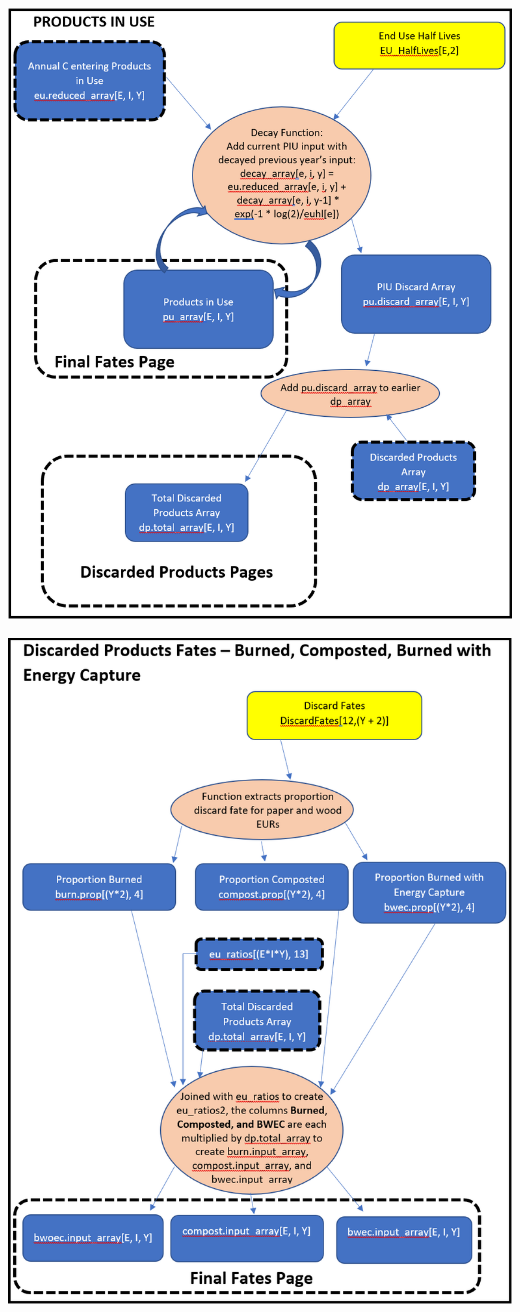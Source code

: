 \documentclass[
]{book}
\begin{document}
\newpage

\includegraphics[width=1\linewidth]{images/schematic-3}

\newpage

\includegraphics[width=1\linewidth]{images/schematic-4}
\end{document}
